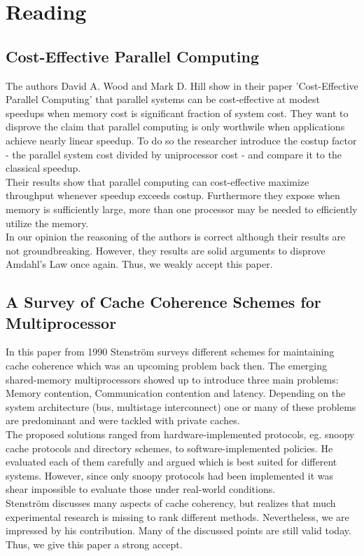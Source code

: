 \documentclass{article}
\newcommand{\enterProblemHeader}[1]{
}
\newcommand{\exitProblemHeader}[1]{
}
\newcounter{homeworkProblemCounter} %
\newcommand{\homeworkProblemName}{}
\newenvironment{homeworkProblem}[1][Problem \arabic{homeworkProblemCounter}]{ %
\stepcounter{homeworkProblemCounter} %
\renewcommand{\homeworkProblemName}{#1} %
\section{\homeworkProblemName} %
}{
}
\begin{document}
\begin{homeworkProblem}[Reading]

\subsection{Cost-Effective Parallel Computing}
The authors David A. Wood and Mark D. Hill show in their paper 'Cost-Effective Parallel 
Computing' that parallel systems can be cost-effective at modest speedups when memory cost
is significant fraction of system cost. They want to disprove the claim that parallel 
computing is only worthwile when applications achieve nearly linear speedup. To do so the 
researcher introduce the costup factor - the parallel system cost divided by uniprocessor
cost - and compare it to the classical speedup.
\\
Their results show that parallel computing can cost-effective maximize throughput whenever
speedup exceeds costup. Furthermore they expose when memory is sufficiently large, more 
than one processor may be needed to efficiently utilize the memory.
\\
In our opinion the reasoning of the authors is correct although their results are not 
groundbreaking. However, they results are solid arguments to disprove Amdahl's Law 
once again. Thus, we weakly accept this paper.


\subsection{A Survey of Cache Coherence Schemes for Multiprocessor}
In this paper from 1990 Stenström surveys different schemes for maintaining cache 
coherence which was an upcoming problem back then. The emerging shared-memory 
multiprocessors showed up to introduce three main problems: Memory contention, 
Communication contention and latency. Depending on the system architecture (bus, 
multistage interconnect) one or many of these problems are predominant and were tackled 
with private caches. \\
The proposed solutions ranged from hardware-implemented protocols, eg. snoopy cache 
protocols and directory schemes, to software-implemented policies. He evaluated each of 
them carefully and argued which is best suited for different systems. However, since 
only snoopy protocols had been implemented it was shear impossible to evaluate those 
under real-world conditions. \\
Stenström discusses many aspects of cache coherency, but realizes that much experimental
research is missing to rank different methods. Nevertheless, we are impressed by his
contribution. Many of the discussed points are still valid today. Thus, we give this 
paper a strong accept.


\end{homeworkProblem}
\end{document}
